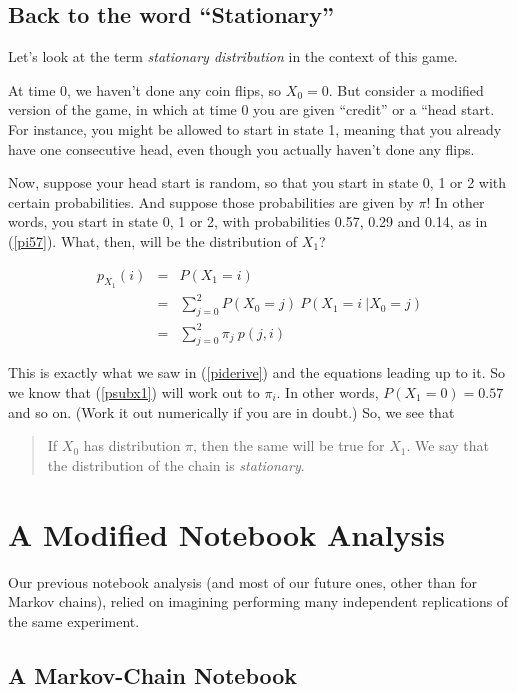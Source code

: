 \subsection{Back to the word ``Stationary''}
\label{backstation}

Let's look at the term {\it stationary distribution} in the context of
this game.

At time 0, we haven't done any coin flips, so $X_0 = 0$.  But consider a
modified version of the game, in which at time 0 you are given
``credit'' or a ``head start.  For instance, you might be allowed to
start in state 1, meaning that you already have one consecutive head,
even though you actually haven't done any flips.

Now, suppose your head start is random, so that you start in state 0, 1
or 2 with certain probabilities.  And suppose those probabilities are
given by $\pi$!  In other words, you start in state 0, 1 or 2, with
probabilities 0.57, 0.29 and 0.14, as in (\ref{pi57}). What, then, will
be the distribution of $X_1$?

\begin{eqnarray}
p_{X_1}(i) &=& P(X_1 = i) \\
&=& \sum_{j=0}^2 P(X_0 = j) ~ P(X_1 = i ~| X_0 = j) \\
&=& \sum_{j=0}^2 \pi_j ~ p(j,i) \label{psubx1}
\end{eqnarray}

This is exactly what we saw in (\ref{piderive}) and the equations
leading up to it.  So we know that (\ref{psubx1}) will work out to
$\pi_i$.  In other words, $P(X_1 = 0) = 0.57$ and so on.
(Work it out numerically if you are in doubt.)  So, we see that

\begin{quote}
If $X_0$ has distribution $\pi$, then the same will be true for $X_1$.
We say that the distribution of the chain is {\it stationary}.
\end{quote}

\section{A Modified Notebook Analysis}
\label{markovnotebook}

Our previous notebook analysis (and most of our future ones, other than
for Markov chains), relied on imagining performing many independent
replications of the same experiment.  

\subsection{A Markov-Chain Notebook}

